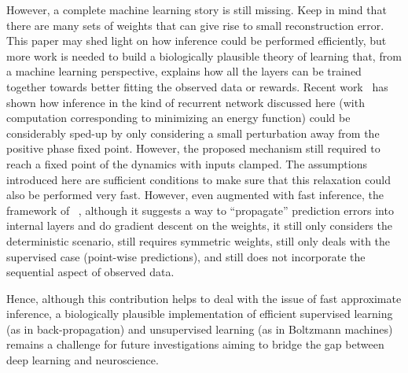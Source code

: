 \documentclass{article}
\newif\iffinal
\begin{document}
However, a complete machine learning story is still missing. Keep in mind that there are many
sets of weights that can give rise to small reconstruction error.  This paper may shed light
on how inference could be performed efficiently, but more work is needed to build a biologically plausible
theory of learning that, from a machine learning perspective, explains how all the layers can be
trained together towards better fitting the observed data or rewards.
Recent work~\citep{Scellier+Bengio-arxiv2016} has shown how 
inference in the kind of recurrent network discussed here (with computation
corresponding to minimizing an energy function) could be considerably
sped-up by only considering a small perturbation away from the positive
phase fixed point. However, the proposed mechanism still required to reach
a fixed point of the dynamics with inputs clamped. The assumptions introduced here
are sufficient conditions to make sure that this relaxation
could also be performed very fast. However, even augmented with fast inference, the
framework of ~\citet{Scellier+Bengio-arxiv2016}, although it suggests a way to ``propagate''
prediction errors into internal layers and do gradient descent on the weights, it
still only considers the deterministic scenario, still requires symmetric weights,
still only deals with the supervised case (point-wise predictions), and still does
not incorporate the sequential aspect of observed data.

Hence, although this contribution helps to deal with the issue of fast
approximate inference, a biologically plausible implementation of efficient supervised
learning (as in back-propagation) and unsupervised learning (as in Boltzmann machines) remains
a challenge for future investigations aiming to bridge the gap between deep learning
and neuroscience.

\iffinal
\section*{Acknowledgments} 
 
The authors would like to thank Walter Senn, Tong Che and Vincent Dumoulin
for feedback and discussions, as well as NSERC, CIFAR, Samsung and
Canada Research Chairs for funding.%
\fi





\end{document}
